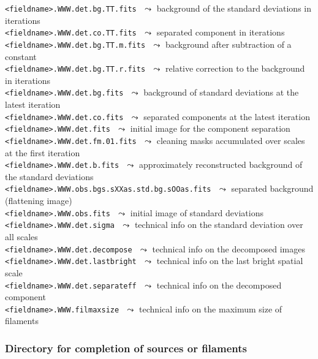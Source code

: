 \documentclass[a4paper,10pt]{article}
\begin{document}
\vspace{-2mm}\noindent
{\small\verb!<fieldname>.WWW.det.bg.TT.fits!} $\,\,\leadsto$ background of the standard deviations in iterations\\
{\small\verb!<fieldname>.WWW.det.co.TT.fits!} $\,\,\leadsto$ separated component in iterations\\
{\small\verb!<fieldname>.WWW.det.bg.TT.m.fits!} $\,\,\leadsto$ background after subtraction of a constant\\
{\small\verb!<fieldname>.WWW.det.bg.TT.r.fits!} $\,\,\leadsto$ relative correction to the background in iterations\\
{\small\verb!<fieldname>.WWW.det.bg.fits!} $\,\,\leadsto$ background of standard deviations at the latest iteration\\
{\small\verb!<fieldname>.WWW.det.co.fits!} $\,\,\leadsto$ separated components at the latest iteration\\
{\small\verb!<fieldname>.WWW.det.fits!} $\,\,\leadsto$ initial image for the component separation\\
{\small\verb!<fieldname>.WWW.det.fm.01.fits!} $\,\,\leadsto$ cleaning masks accumulated over scales at the first iteration\\
{\small\verb!<fieldname>.WWW.det.b.fits!} $\,\,\leadsto$ approximately reconstructed background of the standard deviations\\
{\small\verb!<fieldname>.WWW.obs.bgs.sXXas.std.bg.sOOas.fits!} $\,\,\leadsto$ separated background (flattening image)\\
{\small\verb!<fieldname>.WWW.obs.fits!} $\,\,\leadsto$ initial image of standard deviations\\
{\small\verb!<fieldname>.WWW.det.sigma!} $\,\,\leadsto$ technical info on the standard deviation over all scales\\
{\small\verb!<fieldname>.WWW.det.decompose!} $\,\,\leadsto$ technical info on the decomposed images\\
{\small\verb!<fieldname>.WWW.det.lastbright!} $\,\,\leadsto$ technical info on the last bright spatial scale\\
{\small\verb!<fieldname>.WWW.det.separateff!} $\,\,\leadsto$ technical info on the decomposed component\\
{\small\verb!<fieldname>.WWW.filmaxsize!} $\,\,\leadsto$ technical info on the maximum size of filaments

\subsubsection{Directory for completion of sources or filaments}
\label{complete}
\end{document}
